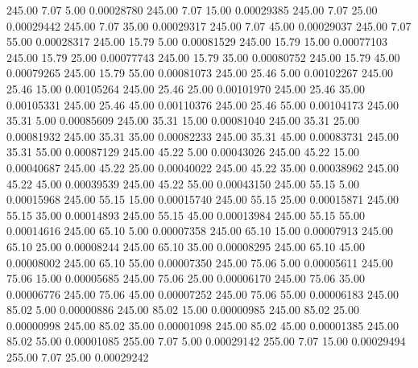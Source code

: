     245.00      7.07      5.00     0.00028780
    245.00      7.07     15.00     0.00029385
    245.00      7.07     25.00     0.00029442
    245.00      7.07     35.00     0.00029317
    245.00      7.07     45.00     0.00029037
    245.00      7.07     55.00     0.00028317
    245.00     15.79      5.00     0.00081529
    245.00     15.79     15.00     0.00077103
    245.00     15.79     25.00     0.00077743
    245.00     15.79     35.00     0.00080752
    245.00     15.79     45.00     0.00079265
    245.00     15.79     55.00     0.00081073
    245.00     25.46      5.00     0.00102267
    245.00     25.46     15.00     0.00105264
    245.00     25.46     25.00     0.00101970
    245.00     25.46     35.00     0.00105331
    245.00     25.46     45.00     0.00110376
    245.00     25.46     55.00     0.00104173
    245.00     35.31      5.00     0.00085609
    245.00     35.31     15.00     0.00081040
    245.00     35.31     25.00     0.00081932
    245.00     35.31     35.00     0.00082233
    245.00     35.31     45.00     0.00083731
    245.00     35.31     55.00     0.00087129
    245.00     45.22      5.00     0.00043026
    245.00     45.22     15.00     0.00040687
    245.00     45.22     25.00     0.00040022
    245.00     45.22     35.00     0.00038962
    245.00     45.22     45.00     0.00039539
    245.00     45.22     55.00     0.00043150
    245.00     55.15      5.00     0.00015968
    245.00     55.15     15.00     0.00015740
    245.00     55.15     25.00     0.00015871
    245.00     55.15     35.00     0.00014893
    245.00     55.15     45.00     0.00013984
    245.00     55.15     55.00     0.00014616
    245.00     65.10      5.00     0.00007358
    245.00     65.10     15.00     0.00007913
    245.00     65.10     25.00     0.00008244
    245.00     65.10     35.00     0.00008295
    245.00     65.10     45.00     0.00008002
    245.00     65.10     55.00     0.00007350
    245.00     75.06      5.00     0.00005611
    245.00     75.06     15.00     0.00005685
    245.00     75.06     25.00     0.00006170
    245.00     75.06     35.00     0.00006776
    245.00     75.06     45.00     0.00007252
    245.00     75.06     55.00     0.00006183
    245.00     85.02      5.00     0.00000886
    245.00     85.02     15.00     0.00000985
    245.00     85.02     25.00     0.00000998
    245.00     85.02     35.00     0.00001098
    245.00     85.02     45.00     0.00001385
    245.00     85.02     55.00     0.00001085
    255.00      7.07      5.00     0.00029142
    255.00      7.07     15.00     0.00029494
    255.00      7.07     25.00     0.00029242
